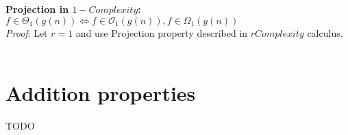  \hfill\break
 
  \textbf{Projection in $1-Complexity$:}  \\  $ f \in \Theta_{1}(g(n)) \Leftrightarrow f \in \mathcal{O}_{1}(g(n)), f \in \Omega_{1}(g(n)) $
      \\\textit{Proof}:
   Let $r = 1$ and use Projection property described in $rComplexity$ calculus.
 \qedsymbol
 \\ \\
 \hfill\break

 
 
 
\section{Addition properties}
TODO
